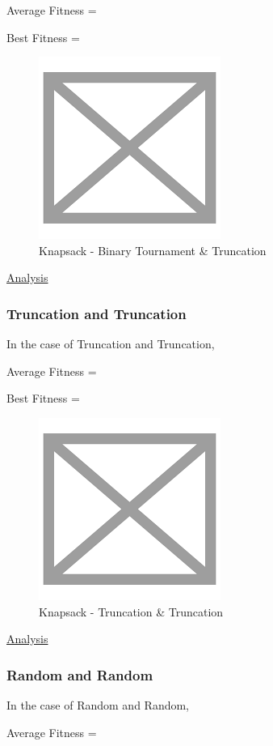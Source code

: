 \documentclass[11pt, letterpaper]{article}
\begin{document}
Average Fitness = 

Best Fitness = 
\begin{figure}[h]
    \centering
    \includegraphics[scale = 0.6]{images/placeHolder.png}
    \caption {Knapsack - Binary Tournament \& Truncation}
    \label {fig:tpsBT}
\end{figure}

\underline{Analysis}

\subsubsection {Truncation and Truncation}
In the case of Truncation and Truncation,

Average Fitness = 

Best Fitness = 
\begin{figure}[H]
    \centering
    \includegraphics[scale = 0.6]{images/placeHolder.png}
    \caption {Knapsack - Truncation \& Truncation}
    \label {fig:tpsTT}
\end{figure}

\underline{Analysis}
\subsubsection {Random and Random}
In the case of Random and Random,

Average Fitness = 
\end{document}
